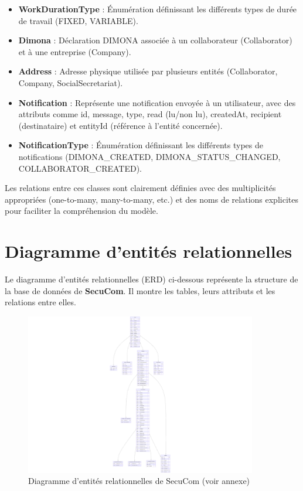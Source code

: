 \begin{itemize}[leftmargin=*,label=\textcolor{darkgray}{$\bullet$},itemsep=0.3em]
  \item \textbf{WorkDurationType} : Énumération définissant les différents types de durée de travail (FIXED, VARIABLE).

  \item \textbf{Dimona} : Déclaration DIMONA associée à un collaborateur (Collaborator) et à une entreprise (Company).

  \item \textbf{Address} : Adresse physique utilisée par plusieurs entités (Collaborator, Company, SocialSecretariat).
  
  \item \textbf{Notification} : Représente une notification envoyée à un utilisateur, avec des attributs comme id, message, type, read (lu/non lu), createdAt, recipient (destinataire) et entityId (référence à l'entité concernée).
  
  \item \textbf{NotificationType} : Énumération définissant les différents types de notifications (DIMONA\_CREATED, DIMONA\_STATUS\_CHANGED, COLLABORATOR\_CREATED).
\end{itemize}

Les relations entre ces classes sont clairement définies avec des multiplicités appropriées (one-to-many, many-to-many, etc.) et des noms de relations explicites pour faciliter la compréhension du modèle.

\newpage

\section{Diagramme d'entités relationnelles}

\noindent Le diagramme d'entités relationnelles (ERD) ci-dessous représente la structure de la base de données de \textbf{SecuCom}. Il montre les tables, leurs attributs et les relations entre elles.

\begin{figure}[H]
\centering
\includegraphics[width=0.9\textwidth]{ERD.png}
\caption{Diagramme d'entités relationnelles de SecuCom (voir annexe)}
\end{figure}


